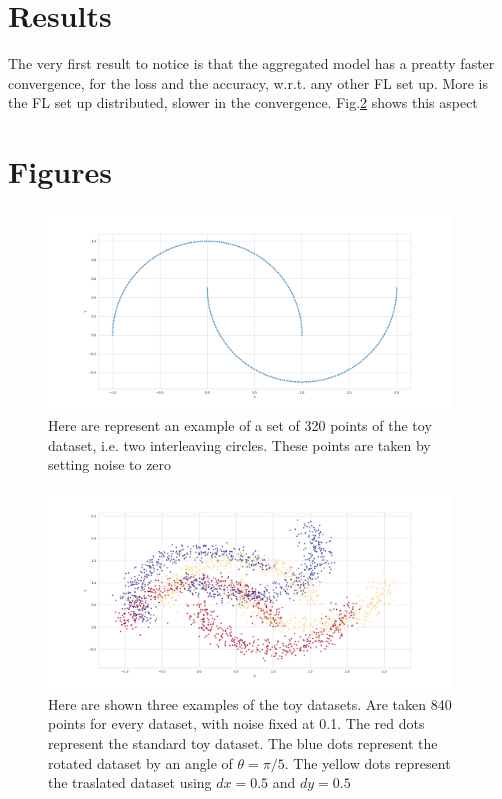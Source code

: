 \documentclass{article} %
\newcounter{points}
\newcounter{other}
\newcounter{late}
\begin{document}
\section {Results}
The very first result to notice is that the aggregated model has a preatty faster convergence,
for the loss and the accuracy, w.r.t. any other FL set up.
More is the FL set up distributed, slower in the convergence.
Fig.\ref{} shows this aspect

\section {Figures}
\begin{figure}[!ht]
    \centering
    \includegraphics[width=0.95\textwidth, keepaspectratio]{images/make_moons_example.png}
    \caption{Here are represent an example of a set of 320 points of the toy dataset, i.e.
        two interleaving circles. These points are taken by setting noise to zero}
    \label{fig1}
\end{figure}
\begin{figure}[!ht]
    \centering
    \includegraphics[width=0.95\textwidth, keepaspectratio]{images/datasets_examples.png}
    \caption{Here are shown three examples of the toy datasets. Are taken 840 points for 
        every dataset, with noise fixed at 0.1. The red dots represent the standard toy 
        dataset. The blue dots represent the rotated dataset by an angle of $\theta=\pi/5$.
        The yellow dots represent the traslated dataset using $dx=0.5$ and $dy=0.5$}
    \label{fig2}
\end{figure}






\newpage
\renewcommand\thefigure{\thesection.\arabic{figure}}
\end{document}
